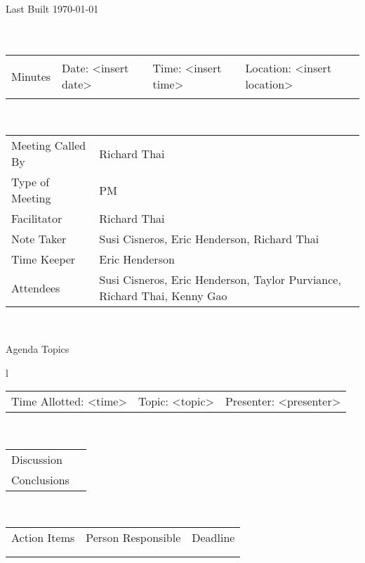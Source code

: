 \documentclass{article}
\begin{document}
Last Built \today\\
~\\
~\\
\begin{tabular}{llll}
\begin{large}Minutes\end{large} & Date: {\textless}insert date{\textgreater} & Time: {\textless}insert time{\textgreater} & Location: {\textless}insert location{\textgreater}
\end{tabular}
~\\
\begin{tabular}{ll}
Meeting Called By & Richard Thai\\
Type of Meeting & PM\\
Facilitator & Richard Thai\\
Note Taker & Susi Cisneros, Eric Henderson, Richard Thai\\
Time Keeper & Eric Henderson\\
Attendees & Susi Cisneros, Eric Henderson, Taylor Purviance, Richard Thai, Kenny Gao\\
\end{tabular}
~\\
\begin{center}
\begin{large}Agenda Topics\end{large}
\end{center}
\begin{tabular}{l}
\begin{tabular}{lll}
Time Allotted: {\textless}time{\textgreater} & Topic: {\textless}topic{\textgreater} & Presenter: {\textless}presenter{\textgreater}
\end{tabular}\\
\begin{tabular}{ll}
Discussion & \\
Conclusions &
\end{tabular}\\
\begin{tabular}{lll}
Action Items & Person Responsible & Deadline\\
 & & \\
 & & \\
\end{tabular}
\end{tabular}
\end{document}
